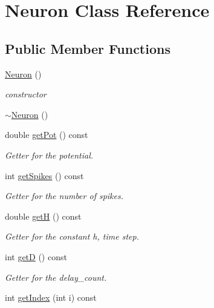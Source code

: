 \hypertarget{classNeuron}{\section{Neuron Class Reference}
\label{classNeuron}
}
\subsection*{Public Member Functions}
\begin{DoxyCompactItemize}
\item 
\hypertarget{classNeuron_a823487d01615fadb8ac19a2768dd9d96}{\hyperlink{classNeuron_a823487d01615fadb8ac19a2768dd9d96}{Neuron} ()}\label{classNeuron_a823487d01615fadb8ac19a2768dd9d96}

\begin{DoxyCompactList}\small\item\em constructor \end{DoxyCompactList}\item 
\hyperlink{classNeuron_a94a250ce7e167760e593979b899745b1}{$\sim$\-Neuron} ()
\item 
double \hyperlink{classNeuron_ad50bdc13371c54c2cb3ee1da8ec9b4b3}{get\-Pot} () const 
\begin{DoxyCompactList}\small\item\em Getter for the potential. \end{DoxyCompactList}\item 
int \hyperlink{classNeuron_ac1edb51fc4fec6c75fc0b136b870e162}{get\-Spikes} () const 
\begin{DoxyCompactList}\small\item\em Getter for the number of spikes. \end{DoxyCompactList}\item 
double \hyperlink{classNeuron_a93d421cadcab22e36ea13dd0cc32310b}{get\-H} () const 
\begin{DoxyCompactList}\small\item\em Getter for the constant h, time step. \end{DoxyCompactList}\item 
int \hyperlink{classNeuron_a505f58b7ea857b257e6bdf41d6157bcb}{get\-D} () const 
\begin{DoxyCompactList}\small\item\em Getter for the delay\-\_\-count. \end{DoxyCompactList}\item 
int \hyperlink{classNeuron_a1d6e0e4830b0088d906befed97c738e0}{get\-Index} (int i) const 

\end{DoxyCompactItemize}
